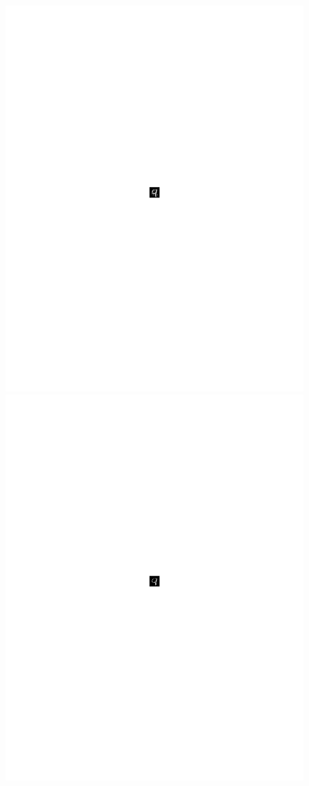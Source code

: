 \begin{figure}
\begin{minipage}{.09\textwidth}
\end{minipage}
\begin{minipage}{.09\textwidth}
	\centering
    \includegraphics[width =0.9\linewidth, trim = 300 400 300 375, clip]{figs/goodfellow9pca.pdf}
\end{minipage}
\begin{minipage}{.09\textwidth}
	\centering
    \includegraphics[width =0.9\linewidth, trim = 300 400 300 375, clip]{figs/papernot9.pdf}

\end{minipage}
\end{figure}
